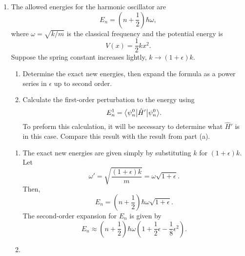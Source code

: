 \documentclass[a4paper, 12pt]{config/homework}
\begin{document}
\begin{enumerate}
\pagebreak
\item The allowed energies for the harmonic oscillator are
\[E_n = \left(n + \frac{1}{2}\right)\hbar\omega,\]
where \(\omega = \sqrt{k/m}\) is the classical frequency and the potential energy is
\[V(x) = \frac{1}{2}kx^2.\]
Suppose the spring constant increases lightly, \(k\to\left(1+\epsilon\right)k\).
\begin{enumerate}[label=(\alph*)]
\item Determine the exact new energies, then expand the formula as a power series in \(\epsilon\) up to second order.
\item Calculate the first-order perturbation to the energy using
\[E_n^1=\bra*{\psi_n^0}\hat{H}'\ket*{\psi_n^0}.\]
To preform this calculation, it will be necessary to determine what \(\hat{H}'\) is in this case. Compare this result with the result from part (a).
\end{enumerate}
\bigskip
\begin{enumerate}[label=(\alph*)]
\item The exact new energies are given simply by substituting \(k\) for \((1+\epsilon)k\). Let
\[\omega' = \sqrt{\frac{(1+\epsilon)k}{m}} = \omega\sqrt{1+\epsilon}.\]
Then,
\[E_n = \left(n+\frac{1}{2}\right)\hbar\omega\sqrt{1+\epsilon}.\]
The second-order expansion for \(E_n\) is given by
\[E_n \approx \left(n+\frac{1}{2}\right)\hbar\omega\left(1 + \frac{1}{2}\epsilon - \frac{1}{8}\epsilon^2\right).\]

\pagebreak
\item 
\end{enumerate}
\end{enumerate}
\end{document}
